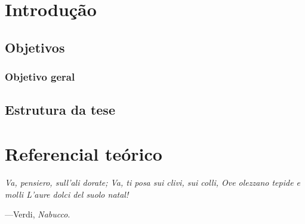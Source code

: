 \documentclass[
	12pt,				  %
	openright,	  %
	oneside,			%
	a4paper,			%
	english,			%
	french,				%
	spanish,			%
	brazil				%
	]{abntex2}
\begin{document}

\tableofcontents*
\cleardoublepage


\textual

\chapter{Introdução}



\clearpage
\section{Objetivos}
\label{sec:objetivos}

\subsection*{Objetivo geral}


\section{Estrutura da tese}
\label{sec:estrutura_da_tese}



\chapter{Referencial teórico}
\label{ch:referencial_teorico}

\epigraph{\itshape Va, pensiero, sull'ali dorate; 
Va, ti posa sui clivi, sui colli, 
Ove olezzano tepide e molli 
L'aure dolci del suolo natal!}{---Verdi, \emph{Nabucco}.}
\end{document}
